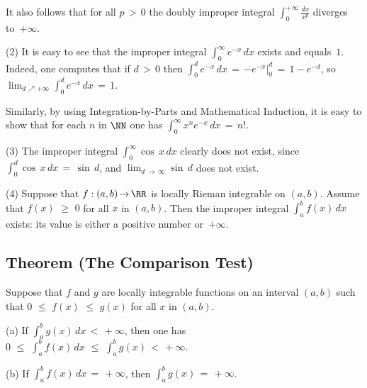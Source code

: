 {        It also follows that for all $p\,>\,0$ the doubly improper integral ${\displaystyle \int_{0}^{+{\infty}} \frac{dx}{x^{p}}}$ diverges to~$+{\infty}$.

\V

        (2) It is easy to see that the improper integral ${\displaystyle \int_{0}^{{\infty}} e^{-x}\,dx}$ exists and equals~$1$.
    Indeed, one computes that if $d\,>\,0$ then ${\displaystyle \int_{0}^{d} e^{-x}\,dx \,=\, \left.-e^{-x}\right|_{0}^{d} \,=\, 1-e^{-d}}$,
    so ${\displaystyle \lim_{d{\nearrow}+{\infty}} \int_{0}^{d} e^{-x}\,dx \,=\, 1}$.

        Similarly, by using Integration-by-Parts and Mathematical Induction, it is easy to show that for each $n$ in ${\NN}$ one has ${\displaystyle \int_{0}^{{\infty}} x^{n}e^{-x}\,dx \,=\, n!}$.

\V

        (3) The improper integral ${\displaystyle \int_{0}^{{\infty}} {\cos}\,x\,dx}$ clearly does not exist, since ${\displaystyle \int_{0}^{d} {\cos}\,x}\,dx  \,=\, {\sin}\,d$, and $\lim_{d \,{\rightarrow}\, {\infty}} {\sin}\,d$ does not exist.

\V

        (4) Suppose that $f:(a,b) \,{\rightarrow}\, {\RR}$ is locally Rieman integrable on $(a,b)$.
    Assume that $f(x)\,\,{\geq}\,\,0$ for all $x$ in $(a,b)$.
    Then the improper integral ${\displaystyle \int_{a}^{b} f(x)\,dx}$ exists: its value is either a positive number or~$+{\infty}$.

\V
\V


        \subsection{\small{{\bf Theorem}} (The Comparison Test)}
        \label{ThmH50.90}

\V

        Suppose that $f$ and $g$ are locally integrable functions on an interval $(a,b)$ such that $0\,\,{\leq}\,\,f(x)\,\,{\leq}\,\,g(x)$ for all $x$ in $(a,b)$.

\V

        (a) If ${\displaystyle \int_{a}^{b} g(x)\,dx}\,<\,+{\infty}$, then one has ${\displaystyle 0\,\,{\leq}\,\,\int_{a}^{b} f(x)\,dx\,\,{\leq}\,\,\int_{a}^{b}g(x)\,<\,+{\infty}}$.

\V

        (b) If ${\displaystyle \int_{a}^{b} f(x)\,dx \,=\, +{\infty}}$, then ${\displaystyle \int_{a}^{b} g(x) \,=\, +{\infty}}$.

}
